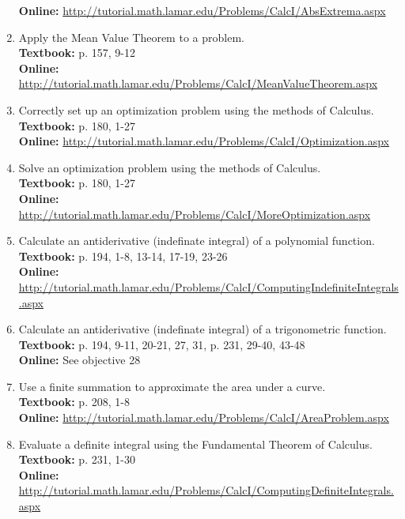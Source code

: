 \documentclass[12pt,landscape]{article}
\begin{document}
\begin{multicols}{2}
\begin{enumerate}
\textbf{Online:} \url{http://tutorial.math.lamar.edu/Problems/CalcI/AbsExtrema.aspx}
\item Apply the Mean Value Theorem to a problem.\\
\textbf{Textbook:} p. 157, 9-12\\
\textbf{Online:} \url{http://tutorial.math.lamar.edu/Problems/CalcI/MeanValueTheorem.aspx}
\item Correctly set up an optimization problem using the methods of Calculus.\\
\textbf{Textbook:} p. 180, 1-27\\
\textbf{Online:} \url{http://tutorial.math.lamar.edu/Problems/CalcI/Optimization.aspx}
\item Solve an optimization problem using the methods of Calculus.\\
\textbf{Textbook:} p. 180, 1-27 \\
\textbf{Online:} \url{http://tutorial.math.lamar.edu/Problems/CalcI/MoreOptimization.aspx}
\item Calculate an antiderivative (indefinate integral) of a polynomial function.\\
\textbf{Textbook:} p. 194, 1-8, 13-14, 17-19, 23-26\\
\textbf{Online:} \url{http://tutorial.math.lamar.edu/Problems/CalcI/ComputingIndefiniteIntegrals.aspx}
\item Calculate an antiderivative (indefinate integral) of a trigonometric function.\\
\textbf{Textbook:} p. 194, 9-11, 20-21, 27, 31, p. 231, 29-40, 43-48\\
\textbf{Online:} See objective 28
\item Use a finite summation to approximate the area under a curve.\\
\textbf{Textbook:} p. 208, 1-8\\
\textbf{Online:} \url{http://tutorial.math.lamar.edu/Problems/CalcI/AreaProblem.aspx}
\item Evaluate a definite integral using the Fundamental Theorem of Calculus.\\
\textbf{Textbook:} p. 231, 1-30 \\
\textbf{Online:} \url{http://tutorial.math.lamar.edu/Problems/CalcI/ComputingDefiniteIntegrals.aspx}

\end{enumerate}
\end{multicols}
\end{document}
